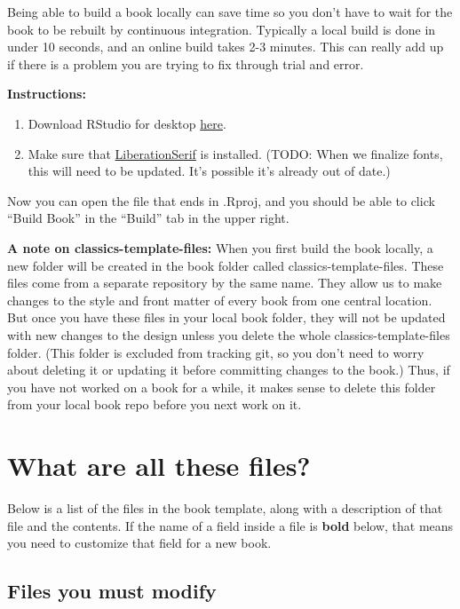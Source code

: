 \documentclass[
]{book}
\providecommand{\tightlist}{%
  \setlength{\itemsep}{0pt}\setlength{\parskip}{0pt}}
\begin{document}
Being able to build a book locally can save time so you don't have to wait for the book to be rebuilt by continuous integration. Typically a local build is done in under 10 seconds, and an online build takes 2-3 minutes. This can really add up if there is a problem you are trying to fix through trial and error.

\textbf{Instructions:}

\begin{enumerate}
\def\labelenumi{\arabic{enumi}.}
\tightlist
\item
  Download RStudio for desktop \href{https://rstudio.com/products/rstudio/}{here}.
\item
  Make sure that \href{https://www.fontsquirrel.com/fonts/liberation-serif}{LiberationSerif} is installed. (TODO: When we finalize fonts, this will need to be updated. It's possible it's already out of date.)
\end{enumerate}

Now you can open the file that ends in .Rproj, and you should be able to click ``Build Book'' in the ``Build'' tab in the upper right.

\textbf{A note on classics-template-files:} When you first build the book locally, a new folder will be created in the book folder called classics-template-files. These files come from a separate repository by the same name. They allow us to make changes to the style and front matter of every book from one central location. But once you have these files in your local book folder, they will not be updated with new changes to the design unless you delete the whole classics-template-files folder. (This folder is excluded from tracking git, so you don't need to worry about deleting it or updating it before committing changes to the book.) Thus, if you have not worked on a book for a while, it makes sense to delete this folder from your local book repo before you next work on it.

\hypertarget{what-are-all-these-files}{%
\section{What are all these files?}\label{what-are-all-these-files}}

Below is a list of the files in the book template, along with a description of that file and the contents. If the name of a field inside a file is \textbf{bold} below, that means you need to customize that field for a new book.

\hypertarget{files-you-must-modify}{%
\subsection{Files you must modify}\label{files-you-must-modify}}
\end{document}
